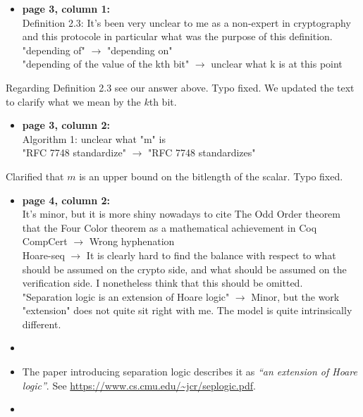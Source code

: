\begin{itemize}

  \item \textbf{page 3, column 1:}\\
    Definition 2.3: It's been very unclear to me as a non-expert in cryptography and this protocole in particular what was the purpose of this definition.\\
    {\color{gray}"depending of" $\rightarrow$ "depending on"}\\
    "depending of the value of the kth bit" $\rightarrow$ unclear what k is at this point
\end{itemize}
\begin{answer}
  Regarding Definition 2.3 see our answer above. Typo fixed. 
  We updated the text to clarify what we mean by the $k$th bit.
\end{answer}

\begin{itemize}
  \item \textbf{page 3, column 2:}\\
    Algorithm 1: unclear what "m" is\\
    "RFC 7748 standardize" $\rightarrow$   "RFC 7748 standardizes"
\end{itemize}
\begin{answer}
  Clarified that $m$ is an upper bound on the bitlength of the scalar. Typo fixed.
\end{answer}

\begin{itemize}
  \item \textbf{page 4, column 2:}\\
    It's minor, but it is more shiny nowadays to cite The Odd Order theorem that the Four Color theorem as a mathematical achievement in Coq\\
    CompCert $\rightarrow$ Wrong hyphenation\\
    Hoare-seq $\rightarrow$ It is clearly hard to find the balance with respect to what should be assumed on the crypto side, and what should be assumed on the verification side. I nonetheless think that this should be omitted.\\
    "Separation logic is an extension of Hoare logic" $\rightarrow$ Minor, but the work "extension" does not quite sit right with me. The model is quite intrinsically different.
\end{itemize}
\begin{answer}
  \begin{itemize}
    \item {}
    \item The paper introducing separation logic describes it as \emph{``an extension of Hoare logic''}.
      See \url{https://www.cs.cmu.edu/~jcr/seplogic.pdf}.
    \item {}
  \end{itemize}
\end{answer}


